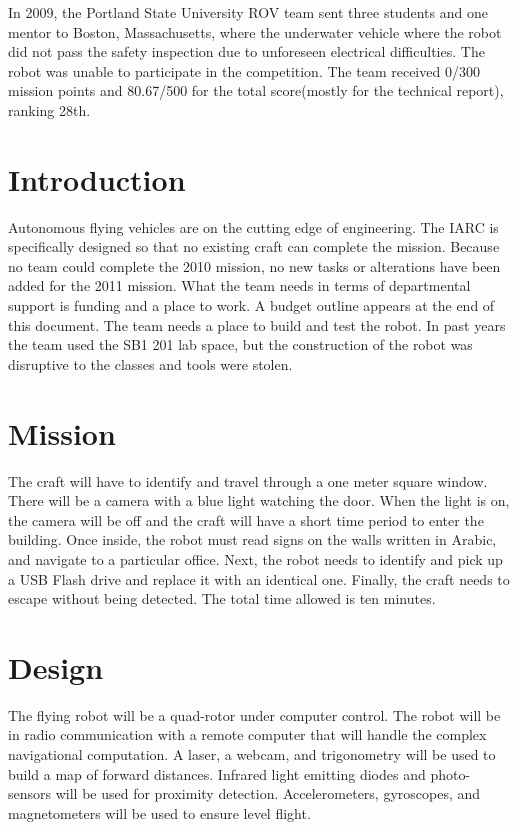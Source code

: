 \documentclass{article}
\begin{document}
In 2009, the Portland State University ROV team sent three students and one mentor to Boston, Massachusetts, where the underwater vehicle where the robot did not pass the safety inspection due to unforeseen electrical difficulties. The robot was unable to participate in the competition. The team received 0/300 mission points and 80.67/500 for the total score(mostly for the technical report), ranking 28th. 


\section{Introduction}

Autonomous flying vehicles are on the cutting edge of engineering. The IARC is specifically designed so that no existing craft can complete the mission. Because no team could complete the 2010 mission, no new tasks or alterations have been added for the 2011 mission. What the team needs in terms of departmental support is funding and a place to work. A budget outline appears at the end of this document. The team needs a place to build and test the robot. In past years the team used the SB1 201 lab space, but the construction of the robot was disruptive to the classes and tools were stolen. 

\section{Mission}

The craft will have to identify and travel through a one meter square window. There will be a camera with a blue light watching the door. When the light is on, the camera will be off and the craft will have a short time period to enter the building. Once inside, the robot must read signs on the walls written in Arabic, and navigate to a particular office. Next, the robot needs to identify and pick up a USB Flash drive and replace it with an identical one. Finally, the craft needs to escape without being detected. The total time allowed is ten minutes. 
\section{Design}

The flying robot will be a quad-rotor under computer control. The robot will be in radio communication with a remote computer that will handle the complex navigational computation. A laser, a webcam, and trigonometry will be used to build a map of forward distances. Infrared light emitting diodes and photo-sensors will be used for proximity detection. Accelerometers, gyroscopes, and magnetometers will be used to ensure level flight. 
\end{document}
